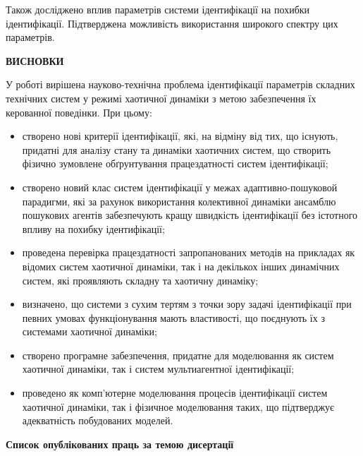 \documentclass[a4paper,13pt]{atuaref}
\newcommand{\xsect}[1]{\medskip\begin{center}\textbf{#1}\end{center}\medskip\penalty10000}
\begin{document}
Також досліджено вплив параметрів системи ідентифікації на похибки ідентифікації.
Підтверджена можливість використання широкого спектру цих параметрів.



\xsect{ВИСНОВКИ}

У роботі вирішена науково-технічна проблема ідентифікації параметрів складних технічних
систем у режимі хаотичної динаміки
з метою забезпечення їх керованної поведінки. При цьому:

\begin{itemize}

  \item
    створено нові критерії ідентифікації, які, на відміну від тих, що
    існують, придатні для аналізу стану та динаміки
    хаотичних систем, що створить фізично зумовлене обґрунтування працездатності систем
    ідентифікації;

  \item
    створено новий клас систем ідентифікації у межах
    адаптивно-пошуковой парадигми,
    які за рахунок використання колективної динаміки
    ансамблю пошукових агентів забезпечують
    кращу швидкість ідентифікації без істотного впливу на похибку ідентифікації;

  \item
    проведена перевірка працездатності запропанованих методів
    на прикладах як відомих систем хаотичної динаміки,
    так і на декількох інших динамічних систем, які проявляють
    складну та хаотичну динаміку;

  \item
   визначено, що системи з сухим тертям з точки зору задачі ідентифікації
   при певних  умовах функціонування
   мають властивості, що поєднують їх з системами хаотичної динаміки;

 \item
  створено програмне забезпечення, придатне для моделювання як систем
  хаотичної динаміки, так і систем мультиагентної ідентифікації;

  \item
  проведено як комп'ютерне моделювання процесів ідентифікації систем
  хаотичної динаміки, так і фізичное моделювання таких, що підтверджує адекватність
  побудованих моделей.


\end{itemize}



\nocite{*}

\xsect{Список опублікованих праць за темою дисертації}
\end{document}
